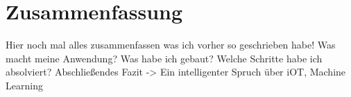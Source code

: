 \chapter{Zusammenfassung}
\label{ch:zusammenfassung}
Hier noch mal alles zusammenfassen was ich vorher so geschrieben habe! Was macht meine Anwendung? Was habe ich gebaut?
Welche Schritte habe ich absolviert? Abschließendes Fazit -> Ein intelligenter Spruch über iOT, Machine Learning